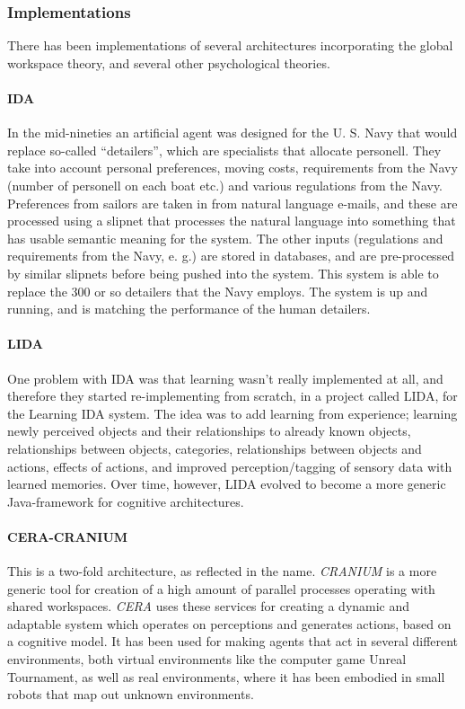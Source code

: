 \subsubsection{Implementations}
There has been implementations of several architectures incorporating the
global workspace theory, and several other psychological theories.

\paragraph{IDA}
In the mid-nineties an artificial agent was designed for the U. S. Navy that
would replace so-called ``detailers'', which are specialists that allocate
personell. They take into account personal preferences, moving
costs, requirements from the Navy (number of personell on each boat etc.) and
various regulations from the Navy. Preferences from sailors are taken in from
natural language e-mails, and these are processed using a slipnet that processes
the natural language into something that has usable semantic meaning for the
system. The other inputs (regulations and requirements from the Navy, e. g.) are
stored in databases, and are pre-processed by similar slipnets before being
pushed into the system. This system is able to replace the 300 or so detailers
that the Navy employs. The system is up and running, and is matching the
performance of the human detailers.
\cite{baars2007architectural}\cite{franklin1998ida}

\paragraph{LIDA}
One problem with IDA was that learning wasn't really implemented at all, and
therefore they started re-implementing from scratch, in a project called LIDA,
for the Learning IDA system. The idea was to add learning from experience;
learning newly perceived objects and their relationships to already known
objects, relationships between objects, categories, relationships between
objects and actions, effects of actions, and improved perception/tagging of
sensory data with learned memories.\cite{franklin2006lida} Over time, however,
LIDA evolved to become a more generic Java-framework for cognitive
architectures.\cite{snaider2011lida}

\paragraph{CERA-CRANIUM}
This is a two-fold architecture, as reflected in the name. {\em CRANIUM} is a
more generic tool for creation of a high amount of parallel processes operating
with shared workspaces. {\em CERA} uses these services for creating a dynamic
and adaptable system which operates on perceptions and generates actions, based
on a cognitive model.\cite{arrabales2009gamechars} It has been used for making
agents that act in several different environments, both virtual environments
like the computer game Unreal Tournament, as well as real environments, where
it has been embodied in small robots that map out unknown environments.
\cite{arrabales2009ceracranium}

